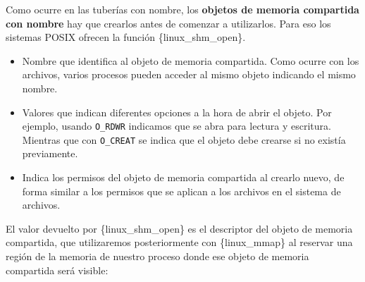 Como ocurre en las tuberías con nombre, los \textbf{objetos de memoria
compartida con nombre} hay que crearlos antes de comenzar a utilizarlos.
Para eso los sistemas POSIX ofrecen la función \{linux\_shm\_open\}.

\begin{Shaded}
\begin{Highlighting}[]
\OperatorTok{=}\OperatorTok{(}   
    \OperatorTok{,}         
\OperatorTok{|}\OperatorTok{,}   
\OperatorTok{);}
\end{Highlighting}
\end{Shaded}

\begin{itemize}
\item
  Nombre que identifica al objeto de memoria compartida. Como ocurre con
  los archivos, varios procesos pueden acceder al mismo objeto indicando
  el mismo nombre.
\item
  Valores que indican diferentes opciones a la hora de abrir el objeto.
  Por ejemplo, usando \texttt{O\_RDWR} indicamos que se abra para
  lectura y escritura. Mientras que con \texttt{O\_CREAT} se indica que
  el objeto debe crearse si no existía previamente.
\item
  Indica los permisos del objeto de memoria compartida al crearlo nuevo,
  de forma similar a los permisos que se aplican a los archivos en el
  sistema de archivos.
\end{itemize}

El valor devuelto por \{linux\_shm\_open\} es el descriptor del objeto
de memoria compartida, que utilizaremos posteriormente con
\{linux\_mmap\} al reservar una región de la memoria de nuestro proceso
donde ese objeto de memoria compartida será visible:

\begin{Shaded}
\begin{Highlighting}[]
\OperatorTok{*}\OperatorTok{=}\OperatorTok{(}
\OperatorTok{,}
\OperatorTok{,}                 
\OperatorTok{|}\OperatorTok{,}
\OperatorTok{,}             
\OperatorTok{,}                  
\OperatorTok{);}
\end{Highlighting}
\end{Shaded}

